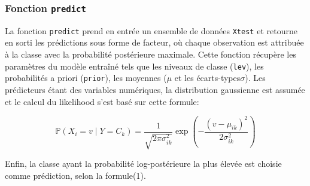 \documentclass[]{article}
\begin{document}
\subsubsection{Fonction \texttt{predict}} 
La fonction \texttt{predict} prend en entrée un ensemble de données \texttt{Xtest} et retourne en sorti les prédictions sous forme de facteur, où chaque observation est attribuée à la classe avec la probabilité postérieure maximale. 
Cette fonction récupère les paramètres du modèle entraîné tels que les niveaux de classe (\texttt{lev}), les probabilités a priori (\texttt{prior}), les moyennes (\(\mu\) et les écarts-types\(\sigma\)). Les prédicteurs étant des variables numériques, la distribution gaussienne est assumée et le calcul du likelihood s'est basé sur cette formule: 

\[
\mathbb{P}\left(X_i=v \mid Y=C_k\right)=\frac{1}{\sqrt{2 \pi \sigma_{i k}^2}} \exp \left(-\frac{\left(v-\mu_{i k}\right)^2}{2 \sigma_{i k}^2}\right)
\]

Enfin, la classe ayant la probabilité log-postérieure la plus élevée est choisie comme prédiction, selon la formule(1).

\vspace{0.2\baselineskip}
\end{document}
